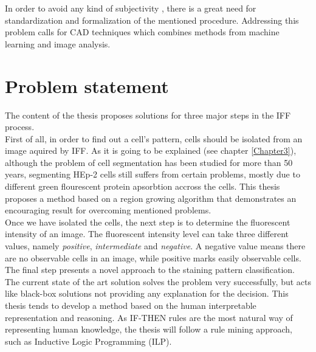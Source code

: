 In order to avoid any kind of subjectivity , there is a great need for standardization and formalization of the mentioned procedure. Addressing this problem calls for CAD techniques which combines methods from machine learning and image analysis.

\section{Problem statement}

The content of the thesis proposes solutions for three major steps in the IFF process. \\

First of all, in order to find out a cell's pattern, cells should be isolated from an image aquired by IFF. As it is going to be explained (see chapter \ref{Chapter3}), although the problem of cell segmentation has been studied for more than 50 years, segmenting HEp-2 cells still suffers from certain problems, mostly due to different green flourescent protein apsorbtion accross the cells. This thesis proposes a method based on a region growing algorithm that demonstrates an encouraging result for overcoming mentioned problems. \\

Once we have isolated the cells, the next step is to determine the fluorescent intensity of an image. The fluorescent intensity level can take three different values, namely \textit{positive}, \textit{intermediate} and \textit{negative}. A negative value means there are no observable cells in an image, while positive marks easily observable cells.  \\

The final step presents a novel approach to the staining pattern classification. The current state of the art solution solves the problem very successfully, but acts like  black-box solutions not providing any explanation for the decision. This thesis tends to develop a method based on the human interpretable representation and reasoning. As IF-THEN rules are the most natural way of representing human knowledge,  the thesis will follow a rule mining approach, such as Inductive Logic Programming (ILP). \\